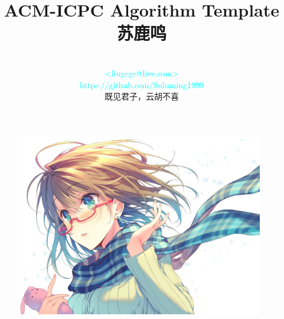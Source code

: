 \documentclass[12pt]{report}
\title{\Huge \textbf{ACM-ICPC Algorithm Template} \linebreak \linebreak \large \textcolor{primary-blue}{\textbf{苏鹿鸣}}}
\author{ \\ \small \textcolor{cyan}{<liugege@live.com>} \\ \small \textcolor{cyan}{https://github.com/Suluming1999} \\ \small 既见君子，云胡不喜}
\begin{document}
\setlength{\headheight}{5mm}
\setlength{\headsep}{5mm}

\begin{titlepage}
    \begin{figure}
        \centering
        \includegraphics[height=8cm]{images/avatar.jpg}
    \end{figure}
    
    \maketitle
\end{titlepage}


\tableofcontents       %
\thispagestyle{empty}  %

\newpage
\setcounter{page}{1}   %



%
%
%
%
%
%
%
%

%

%

%

% 
\end{document}
